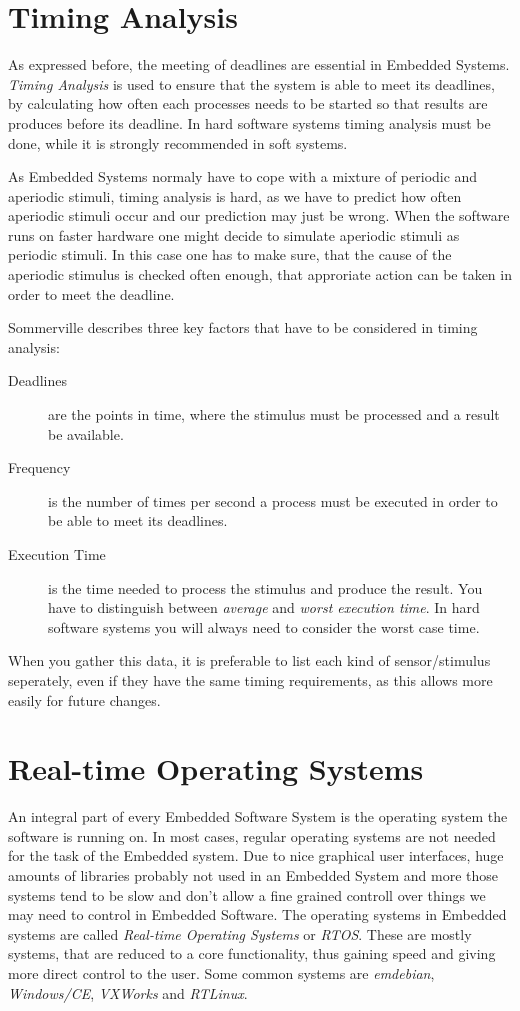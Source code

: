 \documentclass[10pt,a4paper,titlepage,draft]{article} %
\begin{document}
\section{Timing Analysis}
As expressed before, the meeting of deadlines are essential in Embedded Systems.
\emph{Timing Analysis} is used to ensure that the system is able to meet its deadlines, by calculating how often each processes needs to be started so that results are produces before its deadline.
In hard software systems timing analysis must be done, while it is strongly recommended in soft systems.

As Embedded Systems normaly have to cope with a mixture of periodic and aperiodic stimuli, timing analysis is hard, as we have to predict how often aperiodic stimuli occur and our prediction may just be wrong.
When the software runs on faster hardware one might decide to simulate aperiodic stimuli as periodic stimuli.
In this case one has to make sure, that the cause of the aperiodic stimulus is checked often enough, that approriate action can be taken in order to meet the deadline.

Sommerville describes three key factors that have to be considered in timing analysis:
\begin{description}
	\item[Deadlines] are the points in time, where the stimulus must be processed and a result be available.
	\item[Frequency] is the number of times per second a process must be executed in order to be able to meet its deadlines.
	\item[Execution Time] is the time needed to process the stimulus and produce the result.
	You have to distinguish between \emph{average} and \emph{worst execution time}.
	In hard software systems you will always need to consider the worst case time.
\end{description}
When you gather this data, it is preferable to list each kind of sensor/stimulus seperately, even if they have the same timing requirements, as this allows more easily for future changes.

\section{Real-time Operating Systems}
An integral part of every Embedded Software System is the operating system the software is running on.
In most cases, regular operating systems are not needed for the task of the Embedded system.
Due to nice graphical user interfaces, huge amounts of libraries probably not used in an Embedded System and more those systems tend to be slow and don't allow a fine grained controll over things we may need to control in Embedded Software.
The operating systems in Embedded systems are called \emph{Real-time Operating Systems} or \emph{RTOS}.
These are mostly systems, that are reduced to a core functionality, thus gaining speed and giving more direct control to the user.
Some common systems are \emph{emdebian}, \emph{Windows/CE}, \emph{VXWorks} and \emph{RTLinux}.
\end{document}
